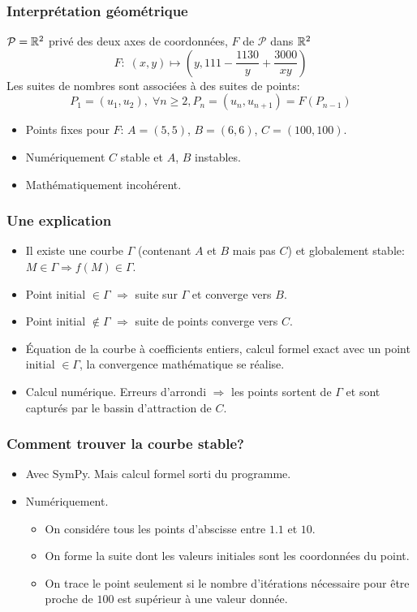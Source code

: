 \begin{frame}
  \frametitle{Interprétation géométrique}
$\mathcal{P} = \mathbb{R}^2$ privé des deux axes de coordonnées, $F$ de $\mathcal{P}$ dans $\mathbb{R}^2$ 
\begin{displaymath}
 F:\; (x,y)\mapsto (y, 111 - \frac{1130}{y} + \frac{3000}{xy})
\end{displaymath}
Les suites de nombres sont associées à des suites de points:
\begin{displaymath}
  P_1 = (u_1,u_2),\; \forall n\geq 2, P_n = (u_n,u_{n+1}) = F(P_{n-1})
\end{displaymath}
\begin{itemize}
  \item Points fixes pour $F$: $A=(5,5)$, $B=(6,6)$, $C=(100,100)$.
  \item Numériquement $C$ stable et $A$, $B$ instables.
  \item Mathématiquement incohérent.
\end{itemize}
\end{frame}

\begin{frame}
  \frametitle{Une explication}
\begin{itemize}
  \item Il existe une courbe $\Gamma$ (contenant $A$ et $B$ mais pas $C$) et globalement stable: $M\in \Gamma \Rightarrow f(M)\in \Gamma$.
  \item Point initial $\in\Gamma$ $\Rightarrow$ suite sur $\Gamma$ et converge vers $B$.
  \item Point initial $\notin \Gamma$ $\Rightarrow$ suite de points converge vers $C$.
  \item \'Equation de la courbe à coefficients entiers, calcul formel exact avec un point initial $\in \Gamma$, la convergence mathématique se réalise.
  \item Calcul numérique. Erreurs d'arrondi $\Rightarrow$ les points sortent de $\Gamma$ et sont capturés par le bassin d'attraction de $C$.
\end{itemize}
\end{frame}

\begin{frame}
  \frametitle{Comment trouver la courbe stable?}
\begin{itemize}
  \item Avec SymPy. Mais calcul formel sorti du programme.
  \item Numériquement.
  \begin{itemize}
    \item On considére tous les points d'abscisse entre $1.1$ et $10$.
    \item On forme la suite dont les valeurs initiales sont les coordonnées du point.
    \item On trace le point seulement si le nombre d'itérations nécessaire pour être proche de $100$ est supérieur à une valeur donnée.
  \end{itemize}
\end{itemize}
\end{frame}

